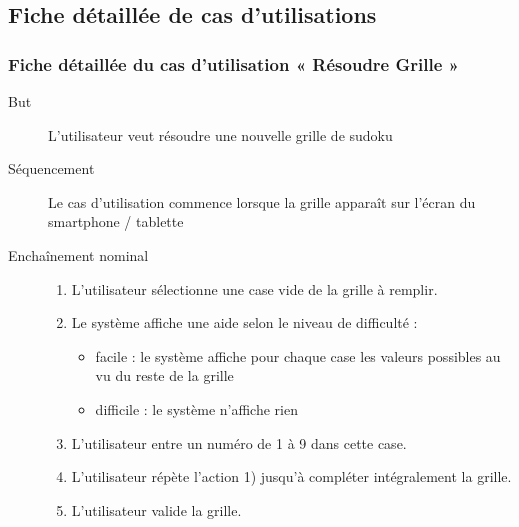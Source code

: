 \documentclass{beamer}
\begin{document}
\subsection{Fiche détaillée de cas d’utilisations}
\begin{frame}
  \frametitle{Fiche détaillée du cas d'utilisation « Résoudre Grille »}
\begin{description}
  \item [But]
    L'utilisateur veut résoudre une nouvelle grille de sudoku
    \pause
  \item [Séquencement]
    Le cas d'utilisation commence lorsque la grille apparaît sur l'écran du
    smartphone / tablette
  \pause
  \item [Enchaînement nominal]
    \begin{enumerate}
      [circle]
    \item
      L'utilisateur sélectionne une case vide de la grille à remplir.
      \pause
    \item
      Le système affiche une aide selon le niveau de difficulté :
      \begin{itemize}
        [circle]
        \item
          facile : le système affiche pour chaque case les valeurs possibles au vu du
          reste de la grille
        \item
          difficile : le système n'affiche rien
        \end{itemize}
      \pause
    \item
      L'utilisateur entre un numéro de 1 à 9 dans cette case.
      \pause
    \item
      L'utilisateur répète l'action 1) jusqu'à compléter intégralement la grille.
      \pause
    \item
      L'utilisateur valide la grille.
    \end{enumerate}
  \end{description}
\end{frame}
\end{document}
